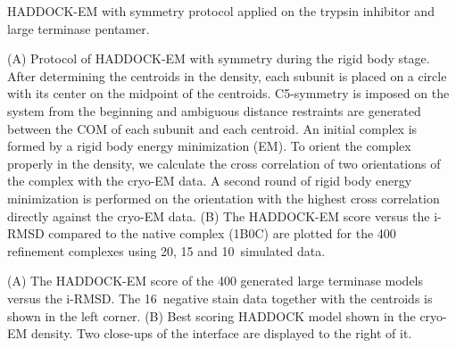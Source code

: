 \caption{HADDOCK-EM with symmetry protocol applied on the trypsin inhibitor and
large terminase pentamer.}
{(A) Protocol of HADDOCK-EM with symmetry during the rigid body stage. After
determining the centroids in the density, each subunit is placed on a circle
with its center on the midpoint of the centroids. C5-symmetry is imposed on the
system from the beginning and ambiguous distance restraints are generated
between the COM of each subunit and each centroid. An initial complex is formed
by a rigid body energy minimization (EM). To orient the complex properly in the
density, we calculate the cross correlation of two orientations of the complex
with the cryo-EM data. A second round of rigid body energy minimization is
performed on the orientation with the highest cross correlation directly
against the cryo-EM data. 
(B) The HADDOCK-EM score versus the i-RMSD compared to the native complex
(1B0C) are plotted for the 400 refinement complexes using 20, 15 and 10\Angstrom\
simulated data.}
\stopbuffer

\caption{}
{(A) The HADDOCK-EM score of the 400 generated large terminase models versus
the i-RMSD. The 16\Angstrom\ negative stain data together with the centroids is shown
in the left corner.
(B) Best scoring HADDOCK model shown in the cryo-EM density. Two close-ups of
the interface are displayed to the right of it.}
\stopbuffer

